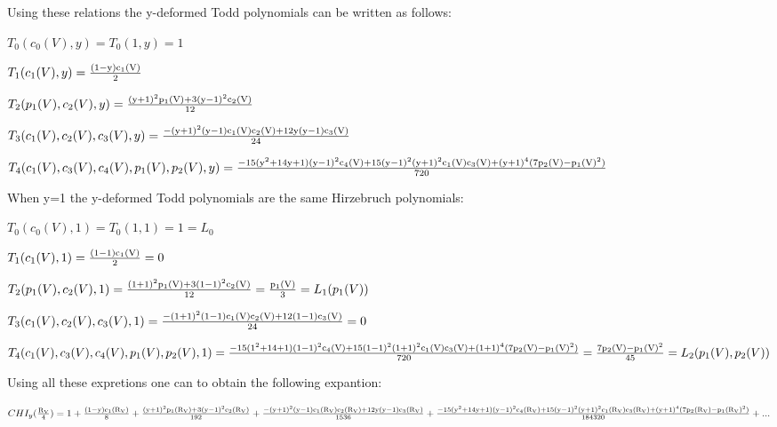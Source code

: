 \documentclass[a4paper,a4paper]{article}
\begin{document}
Using these relations the y-deformed Todd polynomials can be written as follows:

\begin{center}
{  $ T_0(c_0(V),y) =T _0(1,y)=1 $ }
\end{center}
\begin{center}
{  $ T_1(c_1(V),y) = \frac{\rm (1-y)c_1(V)}{\rm 2} $ }
\end{center}
\begin{center}
{  $ T_2(p_1(V),c_2(V),y) = \frac{\rm (y+1)^2p_1(V)+3(y-1)^2c_2(V)}{\rm 12} $ }
\end{center}
\begin{center}
{  $ T_3(c_1(V),c_2(V),c_3(V),y) = \frac{\rm -(y+1)^2(y-1)c_1(V)c_2(V)+12y(y-1)c_3(V)}{\rm 24} $ }
\end{center}
\begin{center}
{  $ T_4(c_1(V),c_3(V),c_4(V),p_1(V),p_2(V),y) = \frac{\rm -15(y^2+14y+1)(y-1)^2c_4(V)+15(y-1)^2(y+1)^2c_1(V)c_3(V)+(y+1)^4(7p_2(V)-p_1(V)^2)}{\rm 720} $ }
\end{center}
When y=1 the y-deformed Todd polynomials are the same Hirzebruch polynomials:
\begin{center}
{  $ T_0(c_0(V),1) =T _0(1,1)=1=L_0 $ }
\end{center}
\begin{center}
{  $ T_1(c_1(V),1) = \frac{\rm (1-1)c_1(V)}{\rm 2}=0 $ }
\end{center}
\begin{center}
{  $ T_2(p_1(V),c_2(V),1) = \frac{\rm (1+1)^2p_1(V)+3(1-1)^2c_2(V)}{\rm 12}=\frac{\rm p_1(V)}{\rm 3}=L_1(p_1(V)) $ }
\end{center}
\begin{center}
{  $ T_3(c_1(V),c_2(V),c_3(V),1) = \frac{\rm -(1+1)^2(1-1)c_1(V)c_2(V)+12(1-1)c_3(V)}{\rm 24}=0 $ }
\end{center}
\begin{center}
{  $ T_4(c_1(V),c_3(V),c_4(V),p_1(V),p_2(V),1) = \frac{\rm -15(1^2+14+1)(1-1)^2c_4(V)+15(1-1)^2(1+1)^2c_1(V)c_3(V)+(1+1)^4(7p_2(V)-p_1(V)^2)}{\rm 720}= \frac{\rm 7p_2(V)-p_1(V)^2}{\rm 45}=L_2(p_1(V),p_2(V))$ }
\end{center}
Using all these expretions one can to obtain the following expantion:
\begin{center}
\setlength{\baselineskip}{30pt} 
{  $  CHI_y(\frac{\rm R_V}{\rm 4}) = 1+\frac{\rm (1-y)c_1(R_V)}{\rm 8}+\frac{\rm (y+1)^2p_1(R_V)+3(y-1)^2c_2(R_V)}{\rm 192}+\frac{\rm -(y+1)^2(y-1)c_1(R_V)c_2(R_V)+12y(y-1)c_3(R_V)}{\rm 1536}+\frac{\rm -15(y^2+14y+1)(y-1)^2c_4(R_V)+15(y-1)^2(y+1)^2c_1(R_V)c_3(R_V)+(y+1)^4(7p_2(R_V)-p_1(R_V)^2)}{\rm 184320}+...$ }
\end{center}
\end{document}
